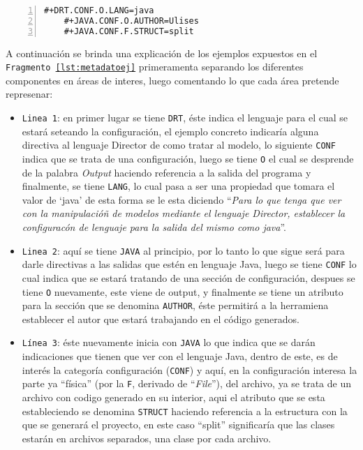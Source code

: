 \begin{lstlisting}[caption={Director - Metadatos ejemplos}, numbers=left,
label=lst:metadatoej]
	#+DRT.CONF.O.LANG=java
	#+JAVA.CONF.O.AUTHOR=Ulises
	#+JAVA.CONF.F.STRUCT=split
\end{lstlisting}

A continuación se brinda una explicación de los ejemplos expuestos en el
\texttt{Fragmento \ref{lst:metadatoej}} primeramenta separando los diferentes
componentes	en áreas de interes, luego comentando lo que cada área pretende
represenar:

\begin{itemize}
	\item \texttt{Linea 1}: en primer lugar se tiene \texttt{DRT}, éste indica el
		lenguaje para el cual se estará seteando la configuración, el ejemplo
		concreto indicaría alguna directiva al lenguaje Director de como tratar al
		modelo, lo siguiente \texttt{CONF} indica que se trata de una
		configuración, luego se tiene \texttt{O} el cual se desprende de la palabra
		\textit{Output} haciendo referencia a la salida del programa y finalmente,
		se tiene \texttt{LANG}, lo cual pasa a ser una propiedad que tomara el
		valor de `java' de esta forma se le esta diciendo ``\textit{Para lo que
		tenga que ver con la manipulacióñ de modelos mediante el lenguaje Director,
		establecer la configuracón de lenguaje para la salida del mismo como
		java}''.
	\item \texttt{Linea 2}: aquí se tiene \texttt{JAVA} al principio, por lo
		tanto lo que sigue será para darle directivas a las salidas que estén en
		lenguaje Java, luego se tiene \texttt{CONF} lo cual indica que se estará
		tratando de una sección de configuración, despues se tiene \texttt{O}
		nuevamente, este viene de output, y finalmente se tiene un atributo para la
		sección que se denomina \texttt{AUTHOR}, éste permitirá a la herramiena
		establecer el autor que estará trabajando en el código generados.
	\item \texttt{Línea 3}: éste nuevamente inicia con \texttt{JAVA} lo que
		indica que se darán indicaciones que tienen que ver con el lenguaje Java,
		dentro de este, es de interés la categoría configuración (\texttt{CONF}) y
		aquí, en la configuración interesa la parte ya ``física'' (por la
		\texttt{F}, derivado de ``\textit{File}''), del archivo, ya
		se trata de un archivo con codigo generado en su interior, aqui el atributo
		que se esta estableciendo se denomina \texttt{STRUCT} haciendo referencia a
		la estructura con la que se generará el proyecto, en este caso ``split''
		significaría que las clases estarán en archivos separados, una clase por
		cada archivo.
\end{itemize}


